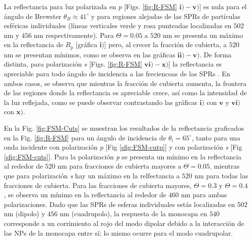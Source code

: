 \documentclass[letterpaper,11pt] {article}
\begin{document}
La reflectancia para luz polarizada en \emph{p} [Figs. \ref{fig:R-FSM} $\mathbf{i)-v)}$] es nula para el ángulo de Brewster $\theta_B \approx 41^\circ$ y para regiones alejadas de las SPRs de  partículas esféricas individuales (líneas verticales verde y rosa punteadas localizadas en $502$ nm y $456$ nm respectivamente). Para $\Theta = 0.05$ a $520$ nm se presenta un máximo en la reflectancia de $R_p$ [gráfica $\mathbf{i)}$] pero, al crecer la fracción de cubierta, a $520$ nm se presentan mínimos, como se observa en las gráficas $\mathbf{ii)-v)}$. De forma distinta, para polarización \emph{s} [Figs. \ref{fig:R-FSM} $\mathbf{vi)-x)}$] la reflectancia es apreciable para todo ángulo de incidencia a las freciencoas de las SPRs . En ambos casos, se observa que mientras la fracción de cubierta aumenta, la frontera de las regiones donde la reflectancia es apreciable crece, así como la intensidad de la luz reflejada, como se puede observar contrastando las gráficas $\mathbf{i)}$ con $\mathbf{v}$ y $\mathbf{vi)}$ con $\mathbf{x)}$. 

En la Fig. \ref{fig:FSM-Cuts} se muestran los resultados de la reflectancia graficados en la Fig. \ref{fig:R-FSM} para un ángulo de incidencia de $\theta_i = 65^\circ$, tanto para una onda incidente con polarización \emph{p} [Fig \ref{sfig:FSM-cutp}] y con polarización \emph{s} [Fig \ref{sfig:FSM-cuts}]. Para la polarización \emph{p} se presenta un mínimo en la reflectancia al rededor de $520$ nm para fracciones de cubierta mayores a $\Theta = 0.05$, mientras que para polarización \emph{s} hay un máximo en la relfectancia a $520$ nm para todas las fracciones de cubierta. Para las fracciones de cubierta mayores, $\Theta = 0.3$ y $\Theta = 0.4$,  se observa un  mínimo en la reflectancia al rededor de $460$ nm para ambas polarizaciones. Dado que las SPRs de esferas individuales estás localizadas en $502$ nm (dipolo) y $456$ nm (cuadrupolo), la respuesta de la monocapa en $540$ corresponde a un corrimiento al rojo del modo dipolar debido a la interacción de las NPs de la monocapa entre sí; lo mismo ocurre para el modo cuadrupolar.
\end{document}
